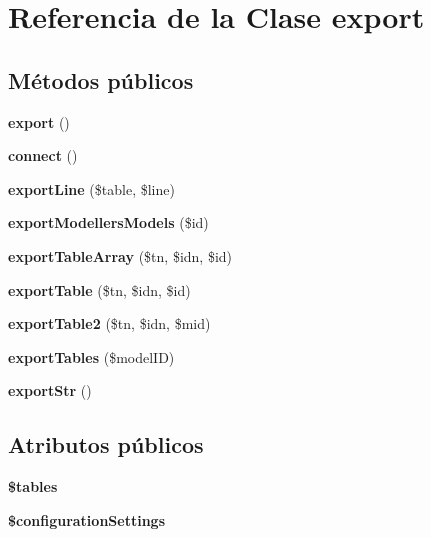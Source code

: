 \hypertarget{classexport}{}\section{Referencia de la Clase export}
\label{classexport}
\subsection*{Métodos públicos}
\begin{DoxyCompactItemize}
\item 
\mbox{\label{classexport_a6bb9adef631ba2c4e6c145c9e8f65d0e}} 
{\bfseries export} ()
\item 
\mbox{\label{classexport_a7491b9998567bd762e24f5c9be0e9a38}} 
{\bfseries connect} ()
\item 
\mbox{\label{classexport_a21bab30d532758a7a55156a4f06cb266}} 
{\bfseries export\+Line} (\$table, \$line)
\item 
\mbox{\label{classexport_abbd1e1328e3da9f01b20e506935722d6}} 
{\bfseries export\+Modellers\+Models} (\$id)
\item 
\mbox{\label{classexport_a582ace8f99822af23299fcd2209295c9}} 
{\bfseries export\+Table\+Array} (\$tn, \$idn, \$id)
\item 
\mbox{\label{classexport_a90fe702f9b0a74dc81c9d0986c2b23fc}} 
{\bfseries export\+Table} (\$tn, \$idn, \$id)
\item 
\mbox{\label{classexport_a50fa4458dbe94ed2c6ea9e4a616728cd}} 
{\bfseries export\+Table2} (\$tn, \$idn, \$mid)
\item 
\mbox{\label{classexport_a6f0205af2076d84df46cc761ec1c068b}} 
{\bfseries export\+Tables} (\$model\+ID)
\item 
\mbox{\label{classexport_abdd608d3ef87829b0e3750fad13b10f2}} 
{\bfseries export\+Str} ()
\end{DoxyCompactItemize}
\subsection*{Atributos públicos}
\begin{DoxyCompactItemize}
\item 
\mbox{\label{classexport_ad82d75c031cf67d8890ffc9c9695948d}} 
{\bfseries \$tables}
\item 
\mbox{\label{classexport_a78444bac26d987c08fcdc31ef7b0088f}} 
{\bfseries \$configuration\+Settings}
\end{DoxyCompactItemize}


